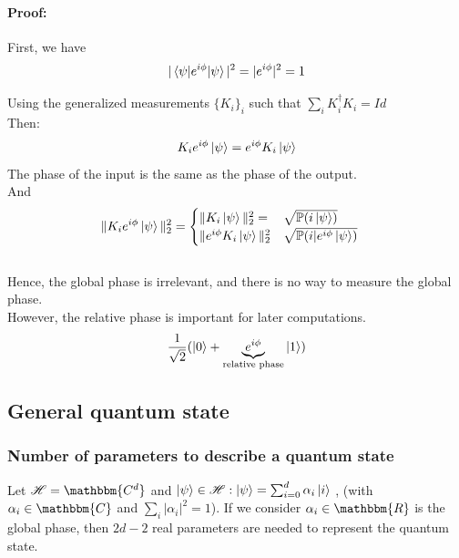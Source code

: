 \documentclass{article}
\begin{document}
\paragraph{Proof: }
First, we have
\begin{equation}
    |\braket{\psi|e^{i\phi}|\psi}|^2 = |e^{i\phi}|^2 = 1
\end{equation}

Using the generalized measurements $\{K_i\}_i$ such that $\sum_i K_i^\dagger K_i
= Id$ \\\noindent Then:
\begin{equation}
    K_ie^{i\phi}\ket{\psi} = e^{i\phi}K_i\ket{\psi}
\end{equation}
\noindent
The phase of the input is the same as the phase of the output. \\\noindent And
\begin{equation}
    \begin{aligned}
        \|K_ie^{i\phi}\ket{\psi}\|^2_2
            & =\begin{cases}
               \| K_i \ket{\psi} \|_2^2 = & \sqrt{ \mathbb{P}(i\ket{\psi})} \\
               \|e^{i\phi} K_i\ket{\psi}\|_2^2 & \sqrt{\mathbb{P}(i|e^{i\phi}\ket{\psi})}
            \end{cases}
    \end{aligned}
\end{equation}
\\\noindent Hence, the global phase is irrelevant, and there is no way to
measure the global phase. \\\noindent However, the relative phase is important
for later computations.
\begin{equation}
    \frac{1}{\sqrt{2}}(\ket{0}+\underbrace{e^{i\phi}}_{\text{relative phase}}\ket{1})
\end{equation}

\subsection{General quantum state}
\subsubsection*{Number of parameters to describe a quantum state}
Let $\mathscr{H} = \mathbbm{C^d}$ and $\ket{\psi} \in \mathscr{H}: \ket{\psi} =
\sum_{i=0}^d \alpha_i \ket{i}$ , (with $\alpha_i \in \mathbbm{C}$ and $\sum_i
|\alpha_i|^2=1$). If we consider $\alpha_i \in \mathbbm{R}$ is the global phase,
then $2d-2$ real parameters are needed to represent the quantum state.
\end{document}
